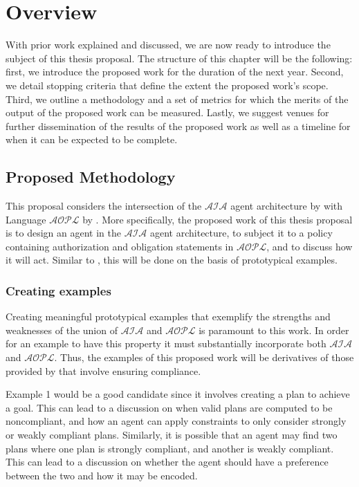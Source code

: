 \chapter{Overview}


With prior work explained and discussed, we are now ready to introduce the subject of this thesis proposal.
The structure of this chapter will be the following: first, we introduce the proposed work for the duration of the next year.
Second, we detail stopping criteria that define the extent the proposed work's scope.
Third, we outline a methodology and a set of metrics for which the merits of the output of the proposed work can be measured.
Lastly, we suggest venues for further dissemination of the results of the proposed work as well as a timeline for when it can be expected to be complete.

\section{Proposed Methodology}

This proposal considers the intersection of the $\mathcal{AIA}$ agent architecture by \citet{blount_towards_2014} with Language $\mathcal{AOPL}$ by \citet{gelfond_authorization_2008}.
More specifically, the proposed work of this thesis proposal is to design an agent in the $\mathcal{AIA}$ agent architecture, to subject it to a policy containing authorization and obligation statements in $\mathcal{AOPL}$, and to discuss how it will act.
Similar to \citet{blount_towards_2014}, this will be done on the basis of prototypical examples.

\subsection{Creating examples}

Creating meaningful prototypical examples that exemplify the strengths and weaknesses of the union of $\mathcal{AIA}$ and $\mathcal{AOPL}$ is paramount to this work.
In order for an example to have this property it must substantially incorporate both $\mathcal{AIA}$ and $\mathcal{AOPL}$.
Thus, the examples of this proposed work will be derivatives of those provided by \citet{blount_towards_2014} that involve ensuring compliance.

Example 1 would be a good candidate since it involves creating a plan to achieve a goal.
This can lead to a discussion on when valid plans are computed to be noncompliant, and how an agent can apply constraints to only consider strongly or weakly compliant plans.
Similarly, it is possible that an agent may find two plans where one plan is strongly compliant, and another is weakly compliant.
This can lead to a discussion on whether the agent should have a preference between the two and how it may be encoded.

